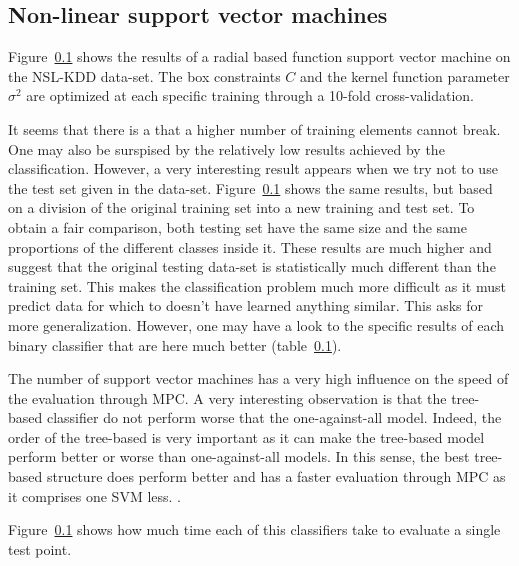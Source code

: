 \subsection{Non-linear support vector machines}

Figure~\ref{} shows the results of a radial based function support vector machine on the NSL-KDD data-set. The box constraints $C$ and the kernel function parameter $\sigma^2$ are optimized at each specific training through a 10-fold cross-validation.

It seems that there is a  that a higher number of training elements cannot break. One may also be surspised by the relatively low results achieved by the classification. However, a very interesting result appears when we try not to use the test set given in the data-set. Figure~\ref{} shows the same results, but based on a division of the original training set into a new training and test set. To obtain a fair comparison, both testing set have the same size and the same proportions of the different classes inside it. These results are much higher and suggest that the original testing data-set is statistically much different than the training set. This makes the classification problem much more difficult as it must predict data for which to doesn't have learned anything similar. This asks for more generalization. However, one may have a look to the specific results of each binary classifier that are here much better (table~\ref{}).

The number of support vector machines has a very high influence on the speed of the evaluation through MPC. A very interesting observation is that the tree-based classifier do not perform worse that the one-against-all model. Indeed, the order of the tree-based is very important as it can make the tree-based model perform better or worse than one-against-all models. In this sense, the best tree-based structure does perform better and has a faster evaluation through MPC as it comprises one SVM less.
.

Figure~\ref{} shows how much time each of this classifiers take to evaluate a single test point. 


